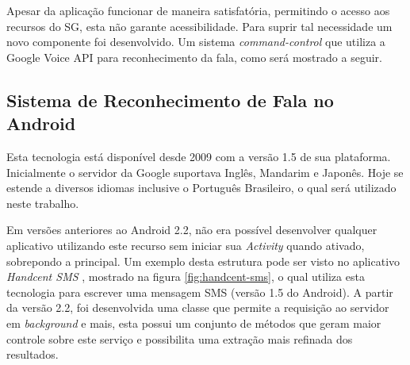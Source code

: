 \documentclass[12pt,a4paper,oneside]{report}
\begin{document}
Apesar da aplicação funcionar de maneira satisfatória, permitindo o acesso aos recursos do SG, esta não garante acessibilidade. Para suprir tal necessidade um novo componente foi desenvolvido. Um sistema \emph{command-control} que utiliza a Google Voice API para reconhecimento da fala, como será mostrado a seguir.

\subsection{Sistema de Reconhecimento de Fala no Android}

Esta tecnologia está disponível desde 2009 com a versão 1.5 de sua plataforma. Inicialmente o servidor da Google suportava Inglês, Mandarim e Japonês. Hoje se estende a diversos idiomas inclusive o Português Brasileiro, o qual será utilizado neste trabalho.

Em versões anteriores ao Android 2.2, não era possível desenvolver qualquer aplicativo utilizando este recurso sem iniciar sua \emph{Activity} quando ativado, sobrepondo a principal. Um exemplo desta estrutura pode ser visto no aplicativo \emph{Handcent SMS} \cite{handcent}, mostrado na figura \ref{fig:handcent-sms}, o qual utiliza esta tecnologia para escrever uma mensagem SMS (versão 1.5 do Android). A partir da versão 2.2, foi desenvolvida uma classe que permite a requisição ao servidor em \emph{background} e mais, esta possui um conjunto de métodos que geram maior controle sobre este serviço e possibilita uma extração mais refinada dos resultados.
\end{document}
